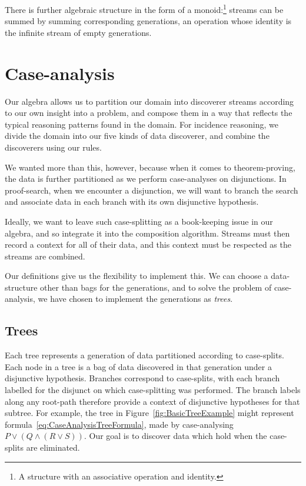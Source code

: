 There is further algebraic structure in the form of a monoid:\footnote{A structure with an associative operation and identity.} streams can be summed by summing corresponding generations, an operation whose identity is the infinite stream of empty generations. 

\section{Case-analysis}
Our algebra allows us to partition our domain into discoverer streams according to our own insight into a problem, and compose them in a way that reflects the typical reasoning patterns found in the domain. For incidence reasoning, we divide the domain into our five kinds of data discoverer, and combine the discoverers using our rules.

We wanted more than this, however, because when it comes to theorem-proving, the data is further partitioned as we perform case-analyses on disjunctions. In proof-search, when we encounter a disjunction, we will want to branch the search and associate data in each branch with its own disjunctive hypothesis. 

Ideally, we want to leave such case-splitting as a book-keeping issue in our algebra, and so integrate it into the composition algorithm. Streams must then record a context for all of their data, and this context must be respected as the streams are combined. 

Our definitions give us the flexibility to implement this. We can choose a data-structure other than bags for the generations, and to solve the problem of case-analysis, we have chosen to implement the generations as \emph{trees}. 

\subsection{Trees}\label{sec:Trees}
Each tree represents a generation of data partitioned according to case-splits. Each node in a tree is a bag of data discovered in that generation under a disjunctive hypothesis. Branches correspond to case-splits, with each branch labelled for the disjunct on which case-splitting was performed. The branch labels along any root-path therefore provide a context of disjunctive hypotheses for that subtree. For example, the tree in Figure~\ref{fig:BasicTreeExample} might represent formula~\ref{eq:CaseAnalysisTreeFormula}, made by case-analysing \mbox{$P \vee (Q \wedge (R \vee S))$}. Our goal is to discover data which hold when the case-splits are eliminated.

